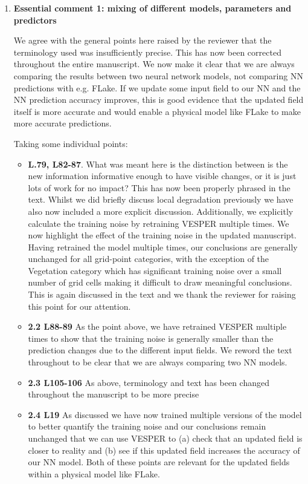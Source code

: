 \documentclass[10pt]{article}
\begin{document}
\begin{enumerate}
	\item \textbf{Essential comment 1: mixing of different models, parameters and predictors}
	
	We agree with the general points here raised by the reviewer that the terminology used was insufficiently precise. This has now been corrected throughout the entire manuscript. We now make it clear that we are always comparing the results between two neural network models, not comparing NN predictions with e.g. FLake. If we update some input field to our NN and the NN prediction accuracy improves, this is good evidence that the updated field itself is more accurate and would enable a physical model like FLake to make more accurate predictions.
	
	Taking some individual points:
	
	\begin{itemize}
		\item \textbf{L.79, L82-87}. What was meant here is the distinction between is the new information informative enough to have visible changes, or it is just lots of work for no impact? This has now been properly phrased in the text. Whilst we did briefly discuss local degradation previously we have also now included a more explicit discussion. Additionally, we explicitly calculate the training noise by retraining VESPER multiple times. We now highlight the effect of the training noise in the updated manuscript. Having retrained the model multiple times, our conclusions are generally unchanged for all grid-point categories, with the exception of the Vegetation category which has significant training noise over a small number of grid cells making it difficult to draw meaningful conclusions. This is again discussed in the text and we thank the reviewer for raising this point for our attention. 		
		\item \textbf{2.2 L88-89} As the point above, we have retrained VESPER multiple times to show that the training noise is generally smaller than the prediction changes due to the different input fields. We reword the text throughout to be clear that we are always comparing two NN models.
		\item \textbf{2.3 L105-106}  As above, terminology and text has been changed throughout the manuscript to be more precise
		\item \textbf{2.4 L19}  As discussed we have now trained multiple versions of the model to better quantify the training noise and our conclusions remain unchanged that we can use VESPER to (a) check that an updated field is closer to reality and (b) see if this updated field increases the accuracy of our NN model. Both of these points are relevant for the updated fields within a physical model like FLake.
	\end{itemize}
	


\end{enumerate}
\end{document}
